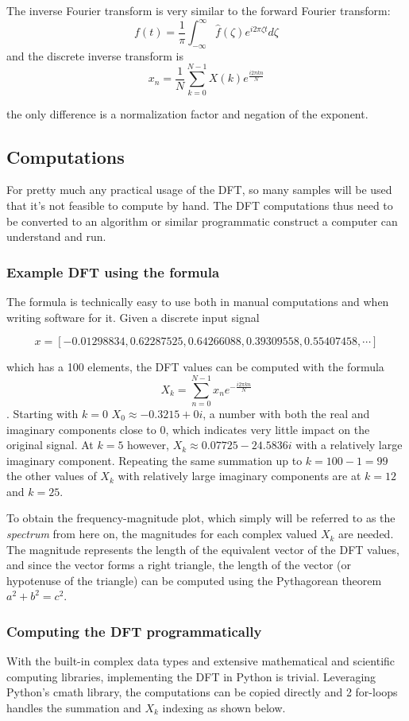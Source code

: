 The inverse Fourier transform is very similar to the forward Fourier transform:
$$ f(t) = \frac{1}{\pi}\int_{-\infty}^{\infty} \hat{f}(\zeta)e^{i2\pi\zeta t} d\zeta$$
and the discrete inverse transform is 
$$ x_n = \frac{1}{N}\sum_{k=0}^{N-1} X(k)e^{\frac{i2\pi kn}{N}}$$

the only difference is a normalization factor and negation of the exponent.

\subsection{Computations}
For pretty much any practical usage of the DFT, so many samples will be used that it's not feasible to compute by hand. The DFT computations thus need to be converted to an algorithm or similar programmatic construct a computer can understand and run.

\subsubsection{Example DFT using the formula}
The formula is technically easy to use both in manual computations and when writing software for it. Given a discrete input signal 

$$x = [-0.01298834,  0.62287525,  0.64266088,  0.39309558,  0.55407458, \cdots]$$

which has a 100 elements, the DFT values can be computed with the formula $$X_k = \sum_{n=0}^{N-1} x_ne^{-\frac{i2\pi kn}{N}}$$. Starting with $k=0$ $X_0 \approx -0.3215+0i$, a number with both the real and imaginary components close to 0, which indicates very little impact on the original signal. At $k=5$ however, $X_k \approx 0.07725-24.5836i$ with a relatively large imaginary component. Repeating the same summation up to $k=100-1 = 99$ the other values of $X_k$ with relatively large imaginary components are at $k=12$ and $k=25$. 

To obtain the frequency-magnitude plot, which simply will be referred to as the \textit{spectrum} from here on, the magnitudes for each complex valued $X_k$ are needed. The magnitude represents the length of the equivalent vector of the DFT values, and since the vector forms a right triangle, the length of the vector (or hypotenuse of the triangle) can be computed using the Pythagorean theorem $a^2 + b^2 = c^2$. 


\subsubsection{Computing the DFT programmatically}
With the built-in complex data types and extensive mathematical and scientific computing libraries, implementing the DFT in Python is trivial. Leveraging Python's cmath library, the computations can be copied directly and 2 for-loops handles the summation and $X_k$ indexing as shown below.

